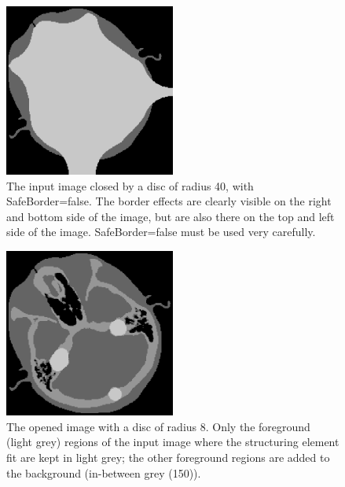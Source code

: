 \documentclass[IJ]{cesj}
\begin{document}
\begin{figure}
\centering
\includegraphics[width=0.5\textwidth]{close-unsafe.eps}
\caption{The input image closed by a disc of radius 40, with SafeBorder=false. The border effects are clearly visible on the right and bottom side of the image, but are also there on the top and left side of the image. SafeBorder=false must be used very carefully.\label{unsafe}}
\end{figure}

\begin{figure}
\centering
\includegraphics[width=0.5\textwidth]{open.eps}
\caption{The opened image with a disc of radius 8. Only the foreground (light grey) regions of the input image where the structuring element fit are kept in light grey; the other foreground regions are added to the background (in-between grey (150)).\label{open}}
\end{figure}
\end{document}
